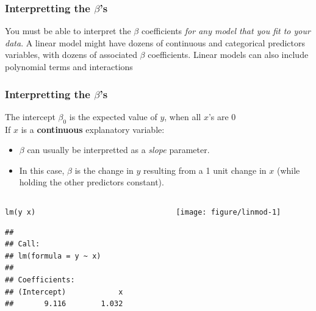 \documentclass[color=usenames,dvipsnames]{beamer}\usepackage[]{graphicx}\usepackage[]{color}
\makeatletter
\newcommand{\hlopt}[1]{\textcolor[rgb]{0,0,0}{#1}}%
\newcommand{\hlstd}[1]{\textcolor[rgb]{0,0,0}{#1}}%
\newcommand{\hlkwd}[1]{\textcolor[rgb]{0.004,0.004,0.506}{#1}}%
\newenvironment{kframe}{%
 \def\at@end@of@kframe{}%
 \ifinner\ifhmode%
  \def\at@end@of@kframe{\end{minipage}}%
  \begin{minipage}{\columnwidth}%
 \fi\fi%
 \def\FrameCommand##1{\hskip\@totalleftmargin \hskip-\fboxsep
 \colorbox{shadecolor}{##1}\hskip-\fboxsep
     \hskip-\linewidth \hskip-\@totalleftmargin \hskip\columnwidth}%
 \MakeFramed {\advance\hsize-\width
   \@totalleftmargin\z@ \linewidth\hsize
   \@setminipage}}%
 {\par\unskip\endMakeFramed%
 \at@end@of@kframe}
\newenvironment{knitrout}{}{} %
\makeatother
\begin{document}




\begin{frame}
  \frametitle{Interpretting the $\beta$'s}
You must be able to interpret the $\beta$
coefficients {\it for any model that you fit to your data}.
\pause
\vfill
A linear model might have dozens of continuous and categorical
predictors variables, with dozens of associated $\beta$ coefficients.
\pause
\vfill
Linear models can also include polynomial terms and interactions
\end{frame}


\begin{frame}[fragile]
  \frametitle{Interpretting the $\beta$'s}%
  \small 
  The intercept $\beta_0$ is the expected value of $y$, when all $x$'s are 0 \\
  \pause
  \vfill
  If $x$ is a {\bf continuous} explanatory variable: %
  \begin{itemize}
    \item $\beta$ can usually be interpretted as a \textit{slope}
      parameter.
    \item In this case, $\beta$ is the
      change in $y$ resulting from a 1 unit change in $x$ (while
      holding the other predictors constant).
    \end{itemize}
\pause
\vfill

\centering
\begin{columns}
  \begin{column}{0.5\textwidth}
\begin{knitrout}\tiny
{}\color{fgcolor}\begin{kframe}
\begin{alltt}
\hlkwd{lm}\hlstd{(y}\hlopt{~}\hlstd{x)}
\end{alltt}
\begin{verbatim}
## 
## Call:
## lm(formula = y ~ x)
## 
## Coefficients:
## (Intercept)            x  
##       9.116        1.032
\end{verbatim}
\end{kframe}
\end{knitrout}
  \end{column}
  \begin{column}{0.4\textwidth}
  \texttt{[image: figure/linmod-1]} \\
  \end{column}
\end{columns}
\end{frame}
\end{document}

